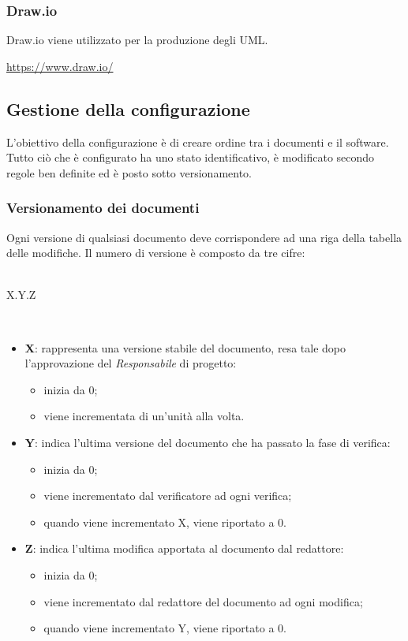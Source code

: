 \subsubsection{Draw.io}
Draw.io viene utilizzato per la produzione degli UML.\\
\centerline{\url{https://www.draw.io/}} 

\subsection{Gestione della configurazione}
L'obiettivo della configurazione è di creare ordine tra i documenti e il software. Tutto ciò che è configurato ha uno stato identificativo, è modificato secondo regole ben definite ed è posto sotto versionamento\glo.

\subsubsection{Versionamento dei documenti}
Ogni versione di qualsiasi documento deve corrispondere ad una riga della tabella delle modifiche. Il numero di versione è composto da tre cifre: \\ \\
\centerline{X.Y.Z} \\
\begin{itemize}
\item \textbf{X}: rappresenta una versione stabile del documento, resa tale dopo l'approvazione del \textit{Responsabile} di progetto: \begin{itemize}
\item inizia da 0; 
\item viene incrementata di un'unità alla volta.
\end{itemize}
\item \textbf{Y}: indica l'ultima versione del documento che ha passato la fase di verifica: \begin{itemize}
\item inizia da 0;
\item viene incrementato dal verificatore ad ogni verifica;
\item quando viene incrementato X, viene riportato a 0.
\end{itemize} 
\item \textbf{Z}: indica l'ultima modifica apportata al documento dal redattore: \begin{itemize}
\item inizia da 0;
\item viene incrementato dal redattore del documento ad ogni modifica;
\item quando viene incrementato Y, viene riportato a 0.
\end{itemize}
\end{itemize}


